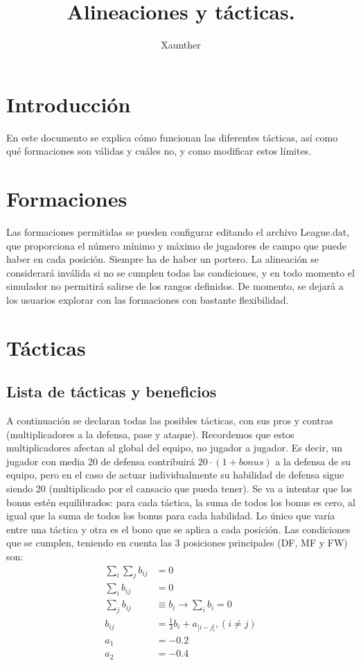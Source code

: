 \documentclass[a4paper,9pt]{article}
\title{Alineaciones y tácticas.}
\author{Xaunther}
\begin{document}
\maketitle

\section{Introducci\'on}
En este documento se explica cómo funcionan las diferentes tácticas, así como qué formaciones son válidas y cuáles no, y como modificar estos límites.

\section{Formaciones}\label{sec:Formaciones}
Las formaciones permitidas se pueden configurar editando el archivo League.dat, que proporciona el número mínimo y máximo de jugadores de campo que puede haber en cada posición. Siempre ha de haber un portero. La alineación se considerará inválida si no se cumplen todas las condiciones, y en todo momento el simulador no permitirá salirse de los rangos definidos. De momento, se dejará a los usuarios explorar con las formaciones con bastante flexibilidad.

\section{Tácticas}\label{sec:Tacticas}
\subsection{Lista de tácticas y beneficios}\label{sec:ListaTacticas}
A continuación se declaran todas las posibles tácticas, con sus pros y contras (multiplicadores a la defensa, pase y ataque). Recordemos que estos multiplicadores afectan al global del equipo, no jugador a jugador. Es decir, un jugador con media 20 de defensa contribuirá $20\cdot (1+bonus)$ a la defensa de su equipo, pero en el caso de actuar individualmente su habilidad de defensa sigue siendo 20 (multiplicado por el cansacio que pueda tener). Se va a intentar que los bonus estén equilibrados: para cada táctica, la suma de todos los bonus es cero, al igual que la suma de todos los bonus para cada habilidad. Lo único que varía entre una táctica y otra es el bono que se aplica a cada posición. Las condiciones que se cumplen, teniendo en cuenta las 3 posiciones principales (DF, MF y FW) son:
\begin{align}
	\sum_i\sum_j b_{ij}&=0\\
	\sum_i b_{ij}&=0\\
	\sum_j b_{ij}&\equiv b_i\rightarrow \sum_i b_i = 0\\
	b_{ij}&=\frac{1}{3}b_i+a_{|i-j|},(i\neq j)\\
	a_1 &= -0.2\\
	a_2 &= -0.4
\end{align}
\end{document}
